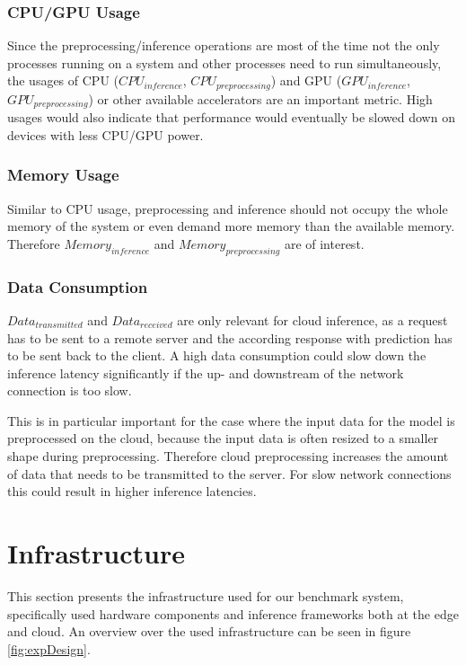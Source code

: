 \subsubsection{CPU/GPU Usage}
Since the preprocessing/inference operations are most of the time not the only processes running on a system and other processes need to run simultaneously, the usages of CPU ($CPU_{inference}$, $CPU_{preprocessing}$) and GPU ($GPU_{inference}$, $GPU_{preprocessing}$) or other available accelerators are an important metric.
High usages would also indicate that performance would eventually be slowed down on devices with less CPU/GPU power.


\subsubsection{Memory Usage}
Similar to CPU usage, preprocessing and inference should not occupy the whole memory of the system or even demand more memory than the available memory. Therefore $Memory_{inference}$ and $Memory_{preprocessing}$ are of interest.

\subsubsection{Data Consumption}
$Data_{transmitted}$ and $Data_{received}$ are only relevant for cloud inference, as a request has to be sent to a remote server and the according response with prediction has to be sent back to the client. A high data consumption could slow down the inference latency significantly if the up- and downstream of the network connection is too slow. 

This is in particular important for the case where the input data for the model is preprocessed on the cloud, because the input data is often resized to a smaller shape during preprocessing. Therefore cloud preprocessing increases the amount of data that needs to be transmitted to the server. For slow network connections this could result in higher inference latencies.





\section{Infrastructure}
\label{chap:infrastructure}
This section presents the infrastructure used for our benchmark system, specifically used hardware components and inference frameworks both at the edge and cloud.
An overview over the used infrastructure can be seen in figure \ref{fig:expDesign}.

